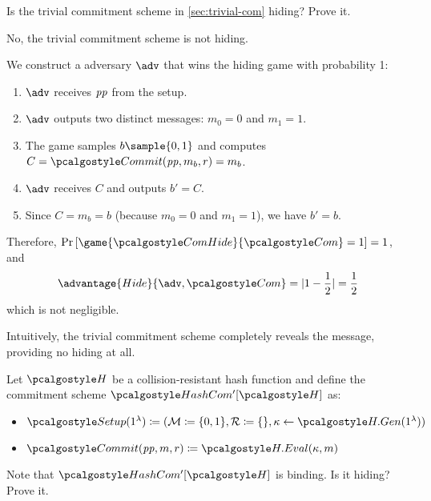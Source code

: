 \begin{exercise}
  Is the trivial commitment scheme in \cref{sec:trivial-com} hiding?
  Prove it.
\end{exercise}

\ifsolutions
\begin{mysolution}
  No, the trivial commitment scheme is not hiding.

  We construct a \ppt adversary $\adv$ that wins the hiding game with probability 1:

  \begin{enumerate}
    \item $\adv$ receives $\mathit{pp}$ from the setup.
    \item $\adv$ outputs two distinct messages: $m_0 = 0$ and $m_1 = 1$.
    \item The game samples $b \sample \{0, 1\}$ and computes $C = \algo{Commit}(\params, m_b, r) = m_b$.
    \item $\adv$ receives $C$ and outputs $b' = C$.
    \item Since $C = m_b = b$ (because $m_0 = 0$ and $m_1 = 1$), we have $b' = b$.
  \end{enumerate}

  Therefore, $\pr{\game{\algo{ComHide}}{\algo{Com}} = 1} = 1$, and 
  \[
    \advantage{Hide}{\adv, \algo{Com}} = |1 - \frac{1}{2}| = \frac{1}{2}
  \]
  which is not negligible.

  Intuitively, the trivial commitment scheme completely reveals the message, providing no hiding at all.
\end{mysolution}
\fi

\begin{exercise}
  Let $\algo{H}$ be a collision-resistant hash function and define the commitment scheme $\algo{HashCom'}[\algo{H}]$ as:
  \begin{itemize}
    \item $\algo{Setup}(1^\lambda) \defeq (\mathcal{M} \defeq \{0, 1\}, \mathcal{R} \defeq \{\}, \kappa \gets \algo{H.Gen}(1^\lambda))$
    \item $\algo{Commit}(\params, m, r) \defeq \algo{H.Eval}(\kappa, m)$
  \end{itemize}
  Note that $\algo{HashCom'}[\algo{H}]$ is binding.
  Is it hiding?
  Prove it.
\end{exercise}

